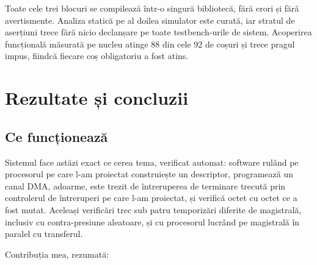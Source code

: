 \documentclass[11pt,openany]{report}
\begin{document}
Toate cele trei blocuri se compilează într-o singură bibliotecă, fără erori și
fără avertismente. Analiza statică pe al doilea simulator este curată, iar
stratul de aserțiuni trece fără nicio declanșare pe toate testbench-urile de
sistem. Acoperirea funcțională măsurată pe nucleu atinge 88 din cele 92 de
coșuri și trece pragul impus, fiindcă fiecare coș obligatoriu a fost atins.

\chapter{Rezultate și concluzii}
\label{ch:concluzii}

\section{Ce funcționează}

Sistemul face astăzi exact ce cerea tema, verificat automat:
software rulând pe procesorul pe care l-am proiectat construiește un descriptor,
programează un canal DMA, adoarme, este trezit de întreruperea de terminare
trecută prin controlerul de întreruperi pe care l-am proiectat, și verifică
octet cu octet ce a fost mutat. Aceleași verificări trec sub patru temporizări
diferite de magistrală, inclusiv cu contra-presiune aleatoare, și cu procesorul
lucrând pe magistrală în paralel cu transferul.

Contribuția mea, rezumată:
\end{document}
